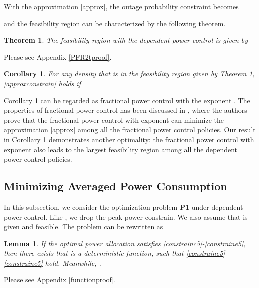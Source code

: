 \documentclass[12pt, draftclsnofoot, journal, letterpaper, onecolumn]{IEEEtran}
\newtheorem{lemma}{Lemma}[section]
\newtheorem{corollary}{Corollary}[section]
\newtheorem{theorem}{Theorem}[section]
\begin{document}
With the approximation \eqref{approx}, the outage probability constraint becomes

and the feasibility region can be characterized by the following theorem.
\begin{theorem}\label{PFR2t}
The feasibility region with the dependent power control is given by

\end{theorem}

\begin{IEEEproof}
  Please see Appendix \ref{PFR2tproof}.
\end{IEEEproof}


\begin{corollary}\label{PFR2tC}
For any density  that is in the feasibility region given by Theorem \ref{PFR2t}, \eqref{approxconstrain} holds if

\end{corollary}

Corollary \ref{PFR2tC} can be regarded as fractional power control with the exponent . The properties of fractional power control has been discussed in \cite{FPC},  where the authors  prove that the fractional power control with exponent  can minimize the approximation \eqref{approx} among all the fractional power control policies. Our result in Corollary \ref{PFR2tC} demonstrates another optimality: the fractional power control with exponent  also leads to the largest feasibility region among all the dependent power control policies.


\subsection{Minimizing Averaged Power Consumption}
In this subsection, we consider the optimization problem \textbf{P1} under dependent power control. Like \cite{FPC}, we drop the peak power constrain. We also assume that  is given and feasible. The problem can be rewritten as


\begin{lemma}\label{function}
If the optimal power allocation  satisfies \eqref{constrainc5}-\eqref{constraine5}, then there exists  that is a deterministic function, such that \eqref{constrainc5}-\eqref{constraine5} hold. Meanwhile, .
\end{lemma}

\begin{IEEEproof}
  Please see Appendix \ref{functionproof}.
\end{IEEEproof}
\end{document}
